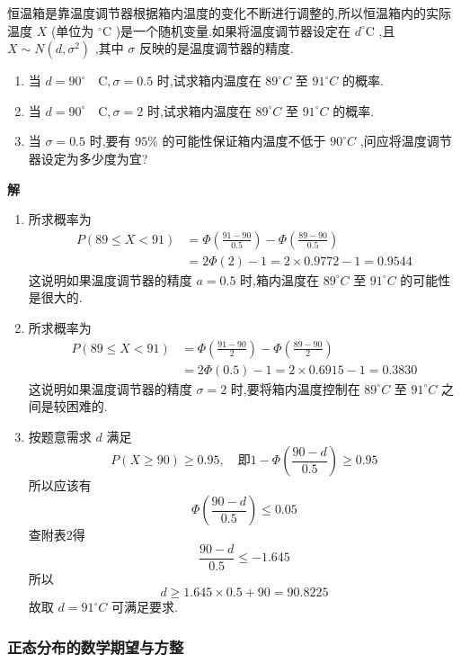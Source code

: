 \begin{example}\label{exam:2.5.3}
	恒温箱是靠温度调节器根据箱内温度的变化不断进行调整的,所以恒温箱内的实际温度 $ X $ (单位为 $ ^{\circ}\mathrm{C} $ )是一个随机变量.如果将温度调节器设定在 $ d^{\circ}\mathrm{C} $ ,且 $ X \sim N\left(d, \sigma^{2}\right) $ ,其中 $ \sigma $ 反映的是温度调节器的精度.
	\begin{enumerate}
		\item 当 $ d=90 ^{\circ}\quad \mathrm{C}, \sigma=0.5 $ 时,试求箱内温度在 $ 89^{\circ}C $ 至 $ 91^{\circ}C $ 的概率.
		\item 当 $ d=90 ^{\circ}\quad \mathrm{C}, \sigma=2 $ 时,试求箱内温度在 $ 89^{\circ}C $ 至 $ 91^{\circ}C $ 的概率.
		\item 当 $ \sigma=0.5 $ 时,要有 $ 95\% $ 的可能性保证箱内温度不低于 $ 90^{\circ}C $ ,问应将温度调节器设定为多少度为宜?
	\end{enumerate}
	
	\textbf{解}
	\begin{enumerate}
		\item 所求概率为
		\[
		\begin{aligned} P(89 \leqslant X<91) &=\Phi\left(\frac{91-90}{0.5}\right)-\Phi\left(\frac{89-90}{0.5}\right) \\ &=2 \Phi(2)-1=2 \times 0.9772-1=0.9544 \end{aligned}
		\]
		这说明如果温度调节器的精度 $ a=0.5 $ 时,箱内温度在 $ 89^{\circ}C $ 至 $ 91^{\circ}C $ 的可能性是很大的.
		\item 所求概率为
		\[
		\begin{aligned} P(89 \leqslant X<91) &=\Phi\left(\frac{91-90}{2}\right)-\Phi\left(\frac{89-90}{2}\right) \\ &=2 \Phi(0.5)-1=2 \times 0.6915-1=0.3830 \end{aligned}
		\]
		这说明如果温度调节器的精度 $ \sigma=2 $ 时,要将箱内温度控制在 $ 89^{\circ}C $ 至 $ 91^{\circ}C $ 之间是较困难的.
		\item 按题意需求 $ d $ 满足
		\[
		P(X \geqslant 90) \geqslant 0.95, \quad \text {即} 1-\Phi\left(\frac{90-d}{0.5}\right) \geqslant 0.95
		\]
		所以应该有
		\[
		\Phi\left(\frac{90-d}{0.5}\right) \leqslant 0.05
		\]
		查附表2得
		\[
		\frac{90-d}{0.5} \leqslant-1.645
		\]
		所以
		\[
		d \geqslant 1.645 \times 0.5+90=90.8225
		\]
		故取 $ d=91^{\circ}C $ 可满足要求.
	\end{enumerate}
\end{example}

\subsubsection{正态分布的数学期望与方整}

